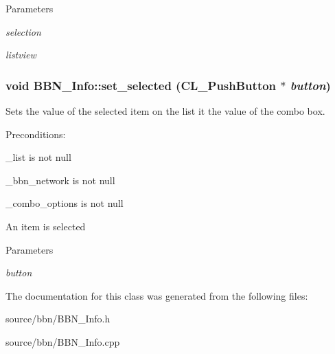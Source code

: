 \begin{DoxyParams}{Parameters}
\item[{\em selection}]\item[{\em listview}]\end{DoxyParams}
\hypertarget{classBBN__Info_a046ddaf4d4c9a257a1c8af08e6c0e953}{
\subsubsection[{set\_\-selected}]{\setlength{\rightskip}{0pt plus 5cm}void BBN\_\-Info::set\_\-selected (CL\_\-PushButton $\ast$ {\em button})}}
\label{classBBN__Info_a046ddaf4d4c9a257a1c8af08e6c0e953}
Sets the value of the selected item on the list it the value of the combo box.

Preconditions:
\begin{DoxyItemize}
\item \_\-list is not null
\item \_\-bbn\_\-network is not null
\item \_\-combo\_\-options is not null
\item An item is selected
\end{DoxyItemize}


\begin{DoxyParams}{Parameters}
\item[{\em button}]\end{DoxyParams}


The documentation for this class was generated from the following files:\begin{DoxyCompactItemize}
\item 
source/bbn/BBN\_\-Info.h\item 
source/bbn/BBN\_\-Info.cpp\end{DoxyCompactItemize}
